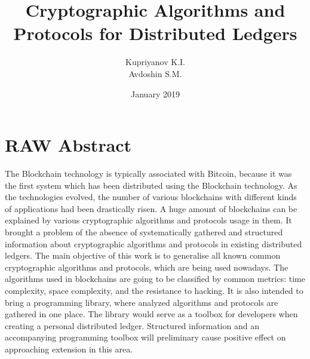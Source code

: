 \documentclass[12pt]{article}
\title{Cryptographic Algorithms and Protocols for Distributed Ledgers}
\author{Kupriyanov K.I.\\Avdoshin S.M.}
\date{January 2019}
\begin{document}
\maketitle

\section*{RAW Abstract}
The Blockchain technology is typically associated with Bitcoin, because it was
the first system which has been distributed using the Blockchain technology.
As the technologies evolved, the number of various blockchains with different
kinds of applications had been drastically risen. A huge amount of blockchains
can be explained by various cryptographic algorithms and protocols usage in
them. It brought a problem of the absence of systematically gathered and
structured information about cryptographic algorithms and protocols in existing
distributed ledgers. The main objective of this work is to generalise all known
common cryptographic algorithms and protocols, which are being used nowadays.
The algorithms used in blockchains are going to be classified by common
metrics: time complexity, space complexity, and the resistance to hacking. It
is also intended to bring a programming library, where analyzed algorithms and
protocols are gathered in one place. The library would serve as a toolbox for
developers when creating a personal distributed ledger.  Structured information
and an accompanying programming toolbox will preliminary cause positive effect
on approaching extension in this area.
\end{document}

